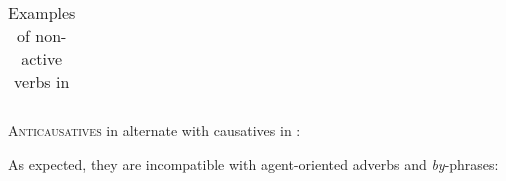 \begin{exe}
\begin{xlist}
\begin{xlist}
\begin{exe}
\begin{xlist}
\begin{xlist}
\begin{exe}
\begin{xlist}
\begin{xlist}
\begin{exe}
\begin{exe}
\begin{xlist}
\begin{exe}
\begin{exe}
\begin{xlist}
\begin{exe}
\begin{exe}
\begin{exe}
\begin{exe}
\begin{exe}
\begin{xlist}
\begin{exe}
\begin{xlist}
\begin{exe}
\begin{exe}
\begin{xlist}
\begin{exe}
\begin{xlist}
\begin{exe}
\begin{xlist}
\begin{exe}
\begin{exe}
\begin{exe}
\begin{xlist}
\begin{exe}
\begin{exe}
\begin{exe}
\begin{xlist}
\begin{exe}
\begin{xlist}
\begin{exe}
\begin{exe}
\begin{xlist}
\begin{exe}
\begin{exe}
\begin{exe}
\begin{exe}
\begin{xlist}
\begin{exe}
\begin{xlist}
\begin{exe}
\begin{xlist}
\begin{exe}
\begin{xlist}
\begin{exe}
\begin{xlist}
\begin{exe}
\begin{xlist}
\begin{exe}
\begin{exe}
\begin{xlist}
\begin{exe}
\begin{xlist}
\begin{exe}
\begin{exe}
\begin{xlist}
\begin{table}
\begin{tabular}{lc>{\itshape}ll>{\itshape}ll}
\end{tabular}
\caption{Examples of non-active verbs in {\thit}\label{tab:3-6:thit}}
\end{table}

\textsc{Anticausatives} in {\thit} alternate with causatives in {\tpie}:
 \begin{exe}
 \ex \label{ex:vz:anticaus-va}
 \begin{xlist} 
	
	
	
 \z
\z 
As expected, they are incompatible with agent-oriented adverbs and \emph{by}-phrases:

 \begin{exe}
	

\end{exe}
\end{xlist}
\end{exe}
\end{xlist}
\end{exe}
\end{exe}
\end{xlist}
\end{exe}
\end{xlist}
\end{exe}
\end{exe}
\end{xlist}
\end{exe}
\end{xlist}
\end{exe}
\end{xlist}
\end{exe}
\end{xlist}
\end{exe}
\end{xlist}
\end{exe}
\end{xlist}
\end{exe}
\end{exe}
\end{exe}
\end{exe}
\end{xlist}
\end{exe}
\end{exe}
\end{xlist}
\end{exe}
\end{xlist}
\end{exe}
\end{exe}
\end{exe}
\end{xlist}
\end{exe}
\end{exe}
\end{exe}
\end{xlist}
\end{exe}
\end{xlist}
\end{exe}
\end{xlist}
\end{exe}
\end{exe}
\end{xlist}
\end{exe}
\end{xlist}
\end{exe}
\end{exe}
\end{exe}
\end{exe}
\end{exe}
\end{xlist}
\end{exe}
\end{exe}
\end{xlist}
\end{exe}
\end{exe}
\end{xlist}
\end{xlist}
\end{exe}
\end{xlist}
\end{xlist}
\end{exe}
\end{xlist}
\end{xlist}
\end{exe}
